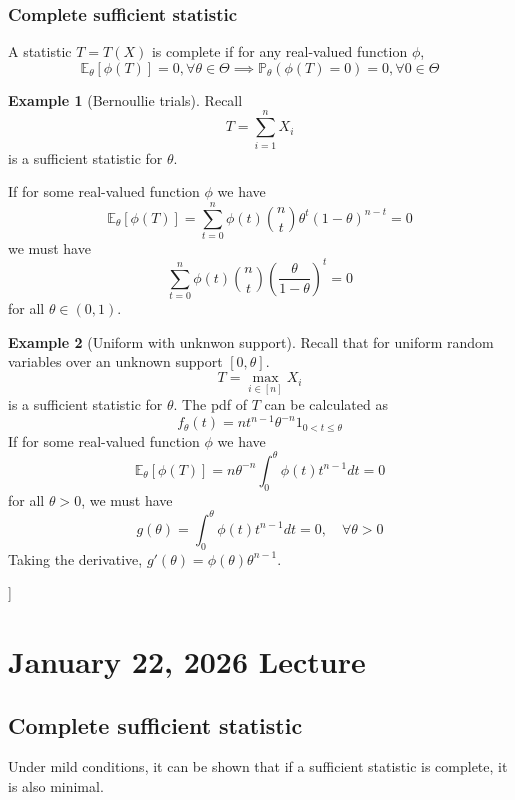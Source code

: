 \documentclass[11pt, oneside]{book}
\theoremstyle{definition}
\newtheorem{exmp}{Example}[section]
\begin{document}
\subsubsection{Complete sufficient statistic}

A statistic $T=T(X)$ is complete if for any real-valued function $\phi$,
\[
    \mathbb{E}_\theta [\phi(T)] = 0, \forall \theta \in \Theta \implies \mathbb{P}_\theta(\phi(T)=0) = 0, \forall 0 \in \Theta   
\]


\begin{exmp}
    [Bernoullie trials]
    Recall
    \[
        T = \sum_{i=1}^{n} X_i
    \]
    is a sufficient statistic for $\theta$.

    If for some real-valued function $\phi$ we have
    \[
        \mathbb{E}_\theta[\phi(T)] = \sum_{t=0}^{n} \phi(t) {n \choose t} \theta^t (1-\theta)^{n-t} = 0   
    \]
    we must have
    \[
        \sum_{t=0}^{n} \phi(t) {n \choose t} \left( \frac{\theta}{1-\theta} \right)^t = 0
    \]
    for all $\theta \in (0, 1)$.

\end{exmp}

\begin{exmp} 
    [Uniform with unknwon support]
    Recall that for uniform random variables over an unknown support $[0, \theta]$.
    \[
        T = \max_{i \in [n]} X_i   
    \]
    is a sufficient statistic for $\theta$.
    The pdf of $T$ can be calculated as
    \[
        f_\theta(t) = n t^{n-1} \theta^{-n} 1_{0 < t \leq \theta}
    \]
    If for some real-valued function $\phi$ we have
    \[
        \mathbb{E}_\theta[\phi(T)] = n \theta^{-n} \int_0^\theta \phi(t) t^{n-1} dt = 0
    \]
    for all $\theta > 0$, we must have
    \[
        g(\theta) = \int_0^\theta \phi(t) t^{n-1} dt = 0, \quad \forall \theta > 0
    \]
    Taking the derivative, $g'(\theta)=\phi(\theta)\theta^{n-1}$.

  \end{exmp}]

\section{January 22, 2026 Lecture}

\subsection{Complete sufficient statistic}
Under mild conditions, it can be shown that if a sufficient statistic is complete, it is also minimal. \\
\end{document}

